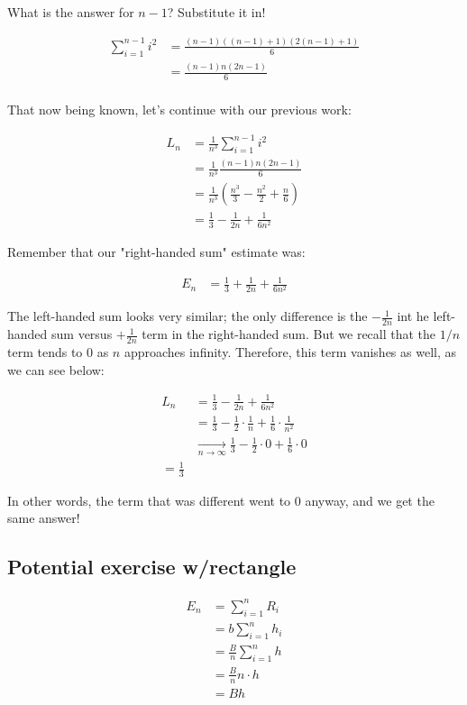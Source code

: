 \documentclass{article}
\begin{document}
What is the answer for $n-1$? Substitute it in!

\begin{align*}
\sum_{i=1}^{n-1} i^2 &= \frac{(n-1)((n-1)+1)(2(n-1)+1)}{6} \\
&= \frac{(n-1)n(2n-1)}{6} \\
\end{align*}


That now being known, let's continue with our previous work:

\begin{align*}
L_n &= \frac{1}{n^3} \sum_{i=1}^{n-1} i^2 \\
&= \frac{1}{n^3} \frac{(n-1)n(2n-1)}{6} \\
&= \frac{1}{n^3} \left( \frac{n^3}{3} - \frac{n^2}{2} + \frac{n}{6} \right) \\
&= \frac{1}{3} - \frac{1}{2n} + \frac{1}{6n^2}
\end{align*}

Remember that our "right-handed sum" estimate was:

\begin{align*}
E_n &= \frac{1}{3} + \frac{1}{2n} + \frac{1}{6n^2}
\end{align*}

The left-handed sum looks very similar; the only difference is the $- \frac{1}{2n}$ int he left-handed sum versus $+ \frac{1}{2n}$ term in the right-handed sum. But we recall that the $1/n$ term tends to 0 as $n$ approaches infinity. Therefore, this term vanishes as well, as we can see below: 

\begin{align*}
L_n &= \frac{1}{3} - \frac{1}{2n} + \frac{1}{6n^2} \\
&= \frac{1}{3} - \frac{1}{2} \cdot \frac{1}{n} + \frac{1}{6} \cdot \frac{1}{n^2} \\
&\xrightarrow[n \to \infty]{} \frac{1}{3} - \frac{1}{2} \cdot 0 + \frac{1}{6} \cdot 0 \\
= \frac{1}{3}
\end{align*}

In other words, the term that was different went to 0 anyway, and we get the same answer! 



\subsection{Potential exercise w/rectangle}

\begin{align*}
E_n &= \sum_{i=1}^n R_i \\
&= b \sum_{i=1}^n h_i \\
&= \frac{B}{n} \sum_{i=1}^n h \\
&= \frac{B}{n} n \cdot h \\
&= Bh \\
\end{align*}
\end{document}
